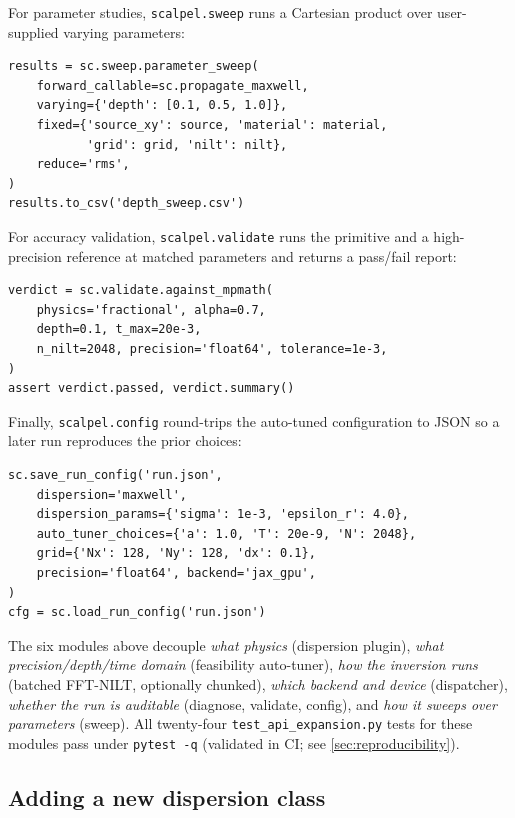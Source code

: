 \documentclass[manuscript,review]{acmart}
\begin{document}
For parameter studies, \texttt{scalpel.sweep} runs a Cartesian
product over user-supplied varying parameters:

\begin{lstlisting}[style=pythonstyle]
results = sc.sweep.parameter_sweep(
    forward_callable=sc.propagate_maxwell,
    varying={'depth': [0.1, 0.5, 1.0]},
    fixed={'source_xy': source, 'material': material,
           'grid': grid, 'nilt': nilt},
    reduce='rms',
)
results.to_csv('depth_sweep.csv')
\end{lstlisting}

For accuracy validation, \texttt{scalpel.validate} runs the primitive
and a high-precision reference at matched parameters and returns a
pass/fail report:

\begin{lstlisting}[style=pythonstyle]
verdict = sc.validate.against_mpmath(
    physics='fractional', alpha=0.7,
    depth=0.1, t_max=20e-3,
    n_nilt=2048, precision='float64', tolerance=1e-3,
)
assert verdict.passed, verdict.summary()
\end{lstlisting}

Finally, \texttt{scalpel.config} round-trips the auto-tuned
configuration to JSON so a later run reproduces the prior choices:

\begin{lstlisting}[style=pythonstyle]
sc.save_run_config('run.json',
    dispersion='maxwell',
    dispersion_params={'sigma': 1e-3, 'epsilon_r': 4.0},
    auto_tuner_choices={'a': 1.0, 'T': 20e-9, 'N': 2048},
    grid={'Nx': 128, 'Ny': 128, 'dx': 0.1},
    precision='float64', backend='jax_gpu',
)
cfg = sc.load_run_config('run.json')
\end{lstlisting}

The six modules above decouple \emph{what physics} (dispersion
plugin), \emph{what precision/depth/time domain} (feasibility
auto-tuner), \emph{how the inversion runs} (batched FFT-NILT,
optionally chunked), \emph{which backend and device} (dispatcher),
\emph{whether the run is auditable} (diagnose, validate, config),
and \emph{how it sweeps over parameters} (sweep). All twenty-four
\texttt{test\_api\_expansion.py} tests for these modules pass under
\texttt{pytest -q} (validated in CI; see
\cref{sec:reproducibility}).

\subsection{Adding a new dispersion class}
\end{document}
